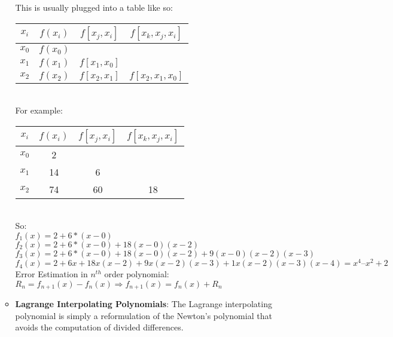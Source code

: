 \documentclass[fontsize=5pt]{scrartcl}
\begin{document}
\begin{multicols}{3}
\begin{enumerate}
\begin{itemize}
              This is usually plugged into a table like so: \\
              \begin{tabular}{|c|c|c|c|}
                \hline
                $x_i$ & $f(x_i)$ & $f[x_j,x_i]$ & $f[x_k,x_j,x_i]$ \\\hline\hline
                $x_0$ & $f(x_0)$ &              &                  \\\hline
                $x_1$ & $f(x_1)$ & $f[x_1,x_0]$ &                  \\\hline
                $x_2$ & $f(x_2)$ & $f[x_2,x_1]$ & $f[x_2,x_1,x_0]$ \\\hline
                \hline
              \end{tabular} \\
              For example: \\
              \begin{tabular}{|c|c|c|c|}
                \hline
                $x_i$ & $f(x_i)$ & $f[x_j,x_i]$ & $f[x_k,x_j,x_i]$ \\\hline\hline
                $x_0$ & 2        &              &                  \\\hline
                $x_1$ & 14       & 6            &                  \\\hline
                $x_2$ & 74       & 60           & 18               \\\hline
                \hline
              \end{tabular} \\
              So: \\
              $f_1(x) = 2+6*(x-0)$\\
              $f_2(x) = 2+6*(x-0)+18(x-0)(x-2)$\\
              $f_3(x) = 2+6*(x-0)+18(x-0)(x-2)+9(x-0)(x-2)(x-3)$\\
              $f_4(x) = 2+6x+18x(x-2)+9x(x-2)(x-3)+1x(x-2)(x-3)(x-4)=x^4–x^2+2 $ \\
              
              Error Estimation in $n^{th}$ order polynomial: $R_n=f_{n+1}(x)-f_n(x)\Rightarrow f_{n+1}(x)=f_n(x)+R_n$
              
          \item \textbf{Lagrange Interpolating Polynomials}: The Lagrange interpolating polynomial is simply a reformulation of the 
                Newton’s polynomial that avoids the computation of divided differences.
                

\end{itemize}
\end{enumerate}
\end{multicols}
\end{document}
